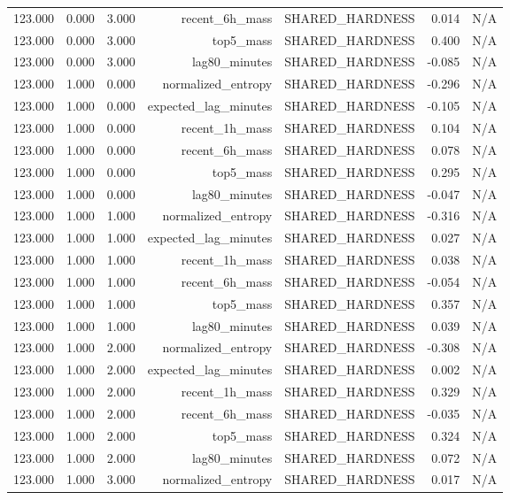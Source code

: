 \begin{table}[h!]
\begin{tabular}{lrrrrrr}
123.000 & 0.000 & 3.000 & recent\_6h\_mass & SHARED\_HARDNESS & 0.014 & N/A \\
123.000 & 0.000 & 3.000 & top5\_mass & SHARED\_HARDNESS & 0.400 & N/A \\
123.000 & 0.000 & 3.000 & lag80\_minutes & SHARED\_HARDNESS & -0.085 & N/A \\
123.000 & 1.000 & 0.000 & normalized\_entropy & SHARED\_HARDNESS & -0.296 & N/A \\
123.000 & 1.000 & 0.000 & expected\_lag\_minutes & SHARED\_HARDNESS & -0.105 & N/A \\
123.000 & 1.000 & 0.000 & recent\_1h\_mass & SHARED\_HARDNESS & 0.104 & N/A \\
123.000 & 1.000 & 0.000 & recent\_6h\_mass & SHARED\_HARDNESS & 0.078 & N/A \\
123.000 & 1.000 & 0.000 & top5\_mass & SHARED\_HARDNESS & 0.295 & N/A \\
123.000 & 1.000 & 0.000 & lag80\_minutes & SHARED\_HARDNESS & -0.047 & N/A \\
123.000 & 1.000 & 1.000 & normalized\_entropy & SHARED\_HARDNESS & -0.316 & N/A \\
123.000 & 1.000 & 1.000 & expected\_lag\_minutes & SHARED\_HARDNESS & 0.027 & N/A \\
123.000 & 1.000 & 1.000 & recent\_1h\_mass & SHARED\_HARDNESS & 0.038 & N/A \\
123.000 & 1.000 & 1.000 & recent\_6h\_mass & SHARED\_HARDNESS & -0.054 & N/A \\
123.000 & 1.000 & 1.000 & top5\_mass & SHARED\_HARDNESS & 0.357 & N/A \\
123.000 & 1.000 & 1.000 & lag80\_minutes & SHARED\_HARDNESS & 0.039 & N/A \\
123.000 & 1.000 & 2.000 & normalized\_entropy & SHARED\_HARDNESS & -0.308 & N/A \\
123.000 & 1.000 & 2.000 & expected\_lag\_minutes & SHARED\_HARDNESS & 0.002 & N/A \\
123.000 & 1.000 & 2.000 & recent\_1h\_mass & SHARED\_HARDNESS & 0.329 & N/A \\
123.000 & 1.000 & 2.000 & recent\_6h\_mass & SHARED\_HARDNESS & -0.035 & N/A \\
123.000 & 1.000 & 2.000 & top5\_mass & SHARED\_HARDNESS & 0.324 & N/A \\
123.000 & 1.000 & 2.000 & lag80\_minutes & SHARED\_HARDNESS & 0.072 & N/A \\
123.000 & 1.000 & 3.000 & normalized\_entropy & SHARED\_HARDNESS & 0.017 & N/A \\

\end{tabular}
\end{table}
